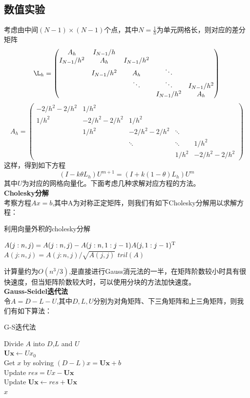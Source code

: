 \documentclass[12pt]{ctexart}
\begin{document}
\subsection{数值实验}
考虑由中间$(N-1)\times(N-1)$个点，其中$N=\frac{1}{h}$为单元网格长，则对应的差分矩阵
$$
\L_h = 
\begin{pmatrix}
A_h & I_{N-1}/h\\
I_{N-1}/h^2 & A_h & I_{N-1}/h^2 \\
& I_{N-1}/h^2 & A_h & \ddots \\
& & \ddots & \ddots & I_{N-1}/h^2\\
& & & I_{N-1}/h^2 & A_h
\end{pmatrix}
$$
$$
A_h = 
\begin{pmatrix}
-2/h^2-2/h^2 & 1/h^2\\
1/h^2 & -2/h^2-2/h^2 & 1/h^2 \\
& 1/h^2 & -2/h^2-2/h^2 & \ddots \\
& & \ddots & \ddots & 1/h^2\\
& & & 1/h^2 & -2/h^2-2/h^2
\end{pmatrix}
$$
这样，得到如下方程
$$
(I - k\theta L_h)U^{m+1} = (I + k(1 - \theta)L_h)U^m
$$
其中$U$为对应的网格向量化。下面考虑几种求解对应方程的方法。\\
\noindent \textbf{Cholesky分解}\\
考察方程$Ax=b$,其中A为对称正定矩阵，则我们有如下Cholesky分解用以求解方程：\\
\begin{algorithm}[H]
	\caption{利用向量外积的cholesky分解}  
	\label{alg:gaxpy chol}
	{ 
		{
			$A(j:n,j) = A(j:n,j) - A(j:n,1:j-1)A(j,1:j-1)^{\rm T}$
		}
		$A(j:n,j) = A(j:n,j)/\sqrt{A(j,j)}$		
	}  
	\Return $tril(A)$\;
\end{algorithm}
\noindent 计算量约为$O(n^3/3)$,是直接进行Gauss消元法的一半，在矩阵阶数较小时具有很快速度，但当矩阵阶数较大时，可以使用分块的方法加快速度。\\
\noindent \textbf{Gauss-Seidel迭代法}\\
令$A = D-L-U$,其中$D,L,U$分别为对角矩阵、下三角矩阵和上三角矩阵，则我们有如下算法：\\
\begin{algorithm}[H]
	\caption{G-S迭代法}  
	\label{alg:GS}
	Divide $A$ into $D$,$L$ and $U$\\
	$\mathbf{Ux} \gets Ux_0$\\
		{
			Get $x$ by solving $(D-L)x = \mathbf{Ux} + b$\\
			Update $res = Ux - \mathbf{Ux}$\\
			Update $\mathbf{Ux} \gets res + \mathbf{Ux}$\\
	}
	\Return $x$\;
\end{algorithm}
\end{document}
